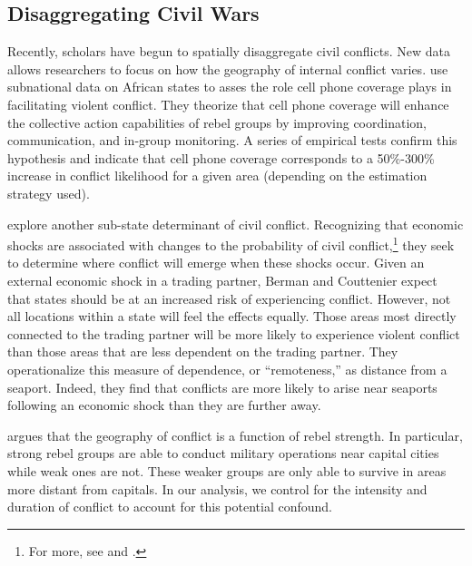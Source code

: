 \subsection{Disaggregating Civil Wars}

Recently, scholars have begun to spatially disaggregate civil conflicts. New data allows researchers to focus on how the geography of internal conflict varies. \citet{pierskalla:hollenbach:2013} use subnational data on African states to asses the role cell phone coverage plays in facilitating violent conflict. They theorize that cell phone coverage will enhance the collective action capabilities of rebel groups by improving coordination, communication, and in-group monitoring. A series of empirical tests confirm this hypothesis and indicate that cell phone coverage corresponds to a 50\%-300\% increase in conflict likelihood for a given area (depending on the estimation strategy used).

\citet{berman:couttenier:2013} explore another sub-state determinant of civil conflict. Recognizing that economic shocks are associated with changes to the probability of civil conflict,\footnote{For more, see \citet{miguel:etal:2004} and \citet{dube:vargas:2013}.} they seek to determine where conflict will emerge when these shocks occur. Given an external economic shock in a trading partner, Berman and Couttenier expect that states should be at an increased risk of experiencing conflict. However, not all locations within a state will feel the effects equally. Those areas most directly connected to the trading partner will be more likely to experience violent conflict than those areas that are less dependent on the trading partner. They operationalize this measure of dependence, or ``remoteness,'' as distance from a seaport. Indeed, they find that conflicts are more likely to arise near seaports following an economic shock than they are further away.

\citet{buhaug:2010} argues that the geography of conflict is a function of rebel strength. In particular, strong rebel groups are able to conduct military operations near capital cities while weak ones are not. These weaker groups are only able to survive in areas more distant from capitals. In our analysis, we control for the intensity and duration of conflict to account for this potential confound.
